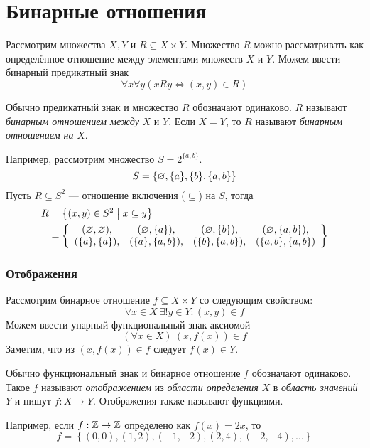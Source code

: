 \part{Бинарные отношения}

Рассмотрим множества $X,Y$ и $R\subseteq X\times Y$. Множество $R$ можно рассматривать
как определённое отношение между элементами множеств $X$ и $Y$. Можем ввести бинарный
предикатный знак
\[
	\forall x\forall y(xRy\iff (x,y)\in R)
\]

Обычно предикатный знак и множество $R$ обозначают одинаково.
$R$ называют {\it бинарным отношением между}
 $X$ и $Y$. Если $X=Y$,
то $R$ называют {\it бинарным отношением на} $X$.

Например, рассмотрим множество $S=2^{\{a,b\}}$.
\[
	S=\{\varnothing,\{a\},\{b\},\{a,b\}\}
\]
Пусть $R\subseteq S^{2}$ --- отношение включения ($\subseteq$) на $S$, тогда
\[
	\begin{aligned}
		R
		 & =\left\{(x,y)\in S^{2}\;\big|\; x\subseteq y\right\}= \\
		 & =\left\{
		\begin{array}{cccc}
			(\varnothing,\varnothing), & (\varnothing,\{a\}),   & (\varnothing,\{b\}),   & (\varnothing,\{a,b\}),  \\
			(\{a\},\{a\}), & (\{a\},\{a,b\}), & (\{b\},\{a,b\}), & (\{a,b\},\{a,b\})
		\end{array}\right\}
	\end{aligned}
\]

\section{Отображения}

Рассмотрим бинарное отношение $f\subseteq X\times Y$ со следующим свойством:
\[
	\forall x\in X~\exists! y\in Y:(x,y)\in f
\]
Можем ввести унарный функциональный знак аксиомой
\[
	(\forall x\in X)~(x,f(x))\in f
\]
Заметим, что из $(x,f(x))\in f$ следует $f(x)\in Y$.

Обычно функциональный знак и бинарное отношение $f$ обозначают одинаково.
Такое $f$ называют {\it отображением}
из {\it области определения} $X$ в
{\it область значений} $Y$ и пишут $f:X\to Y$.
Отображения также называют функциями.

Например, если $f:\mathbb Z\to\mathbb Z$ определено как $f(x)=2x$, то
\[
	f=\left\{(0,0),(1,2),(-1,-2),(2,4),(-2,-4),...\right\}
\]

